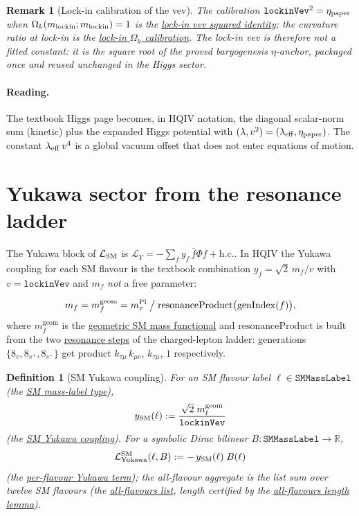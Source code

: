\documentclass[11pt]{amsart}
\newtheorem{definition}[theorem]{Definition}
\newtheorem{remark}[theorem]{Remark}
\begin{document}
\begin{remark}[Lock-in calibration of the vev]
\label{rem:lockin}
The calibration $\texttt{lockinVev}^2=\eta_{\rm paper}$ when
$\Omega_k(m_{\rm lockin};m_{\rm lockin})=1$ is the
\hyperref[lean:lockin-vev-sq]{lock-in vev squared identity}; the curvature
ratio at lock-in is the
\hyperref[lean:omega-k-lockin]{lock-in $\Omega_k$ calibration}. The lock-in
vev is therefore \emph{not} a fitted constant: it is the square root of the
proved baryogenesis $\eta$-anchor, packaged once and reused unchanged in the
Higgs sector.
\end{remark}

\paragraph{Reading.}
The textbook Higgs page becomes, in HQIV notation, the diagonal scalar-norm
sum (kinetic) plus the expanded Higgs potential with
$(\lambda,v^2)=(\lambda_{\rm eff},\eta_{\rm paper})$. The constant
$\lambda_{\rm eff}\,v^4$ is a global vacuum offset that does not enter
equations of motion.

\section{Yukawa sector from the resonance ladder}
\label{sec:yukawa}

The Yukawa block of $\mathcal{L}_{\rm SM}$ is
$\mathcal{L}_Y=-\sum_f y_f\,\bar f\Phi f + \text{h.c.}$. In HQIV the Yukawa
coupling for each SM flavour is the textbook combination $y_f=\sqrt{2}\,
m_f/v$ with $v=\texttt{lockinVev}$ and $m_f$ \emph{not} a free parameter:

\[
m_f = m_f^{\mathrm{geom}}
= m_\tau^{\rm Pl}\;\big/\;\mathrm{resonanceProduct}\bigl(\mathrm{genIndex}(f)\bigr) ,
\]
where $m_f^{\mathrm{geom}}$ is the
\hyperref[lean:sm-mass-label]{geometric SM mass functional} and
$\mathrm{resonanceProduct}$ is built from the two
\hyperref[lean:resonance-steps]{resonance steps} of the charged-lepton
ladder: generations $\{8_v, 8_{s^+}, 8_{s^-}\}$ get product
$k_{\tau\mu}\,k_{\mu e}$, $k_{\tau\mu}$, $1$ respectively.

\begin{definition}[SM Yukawa coupling]
\label{def:yukawa}
For an SM flavour label $\ell\in\texttt{SMMassLabel}$ (the
\hyperref[lean:sm-mass-label-type]{SM mass-label type}),
\[
y_{\rm SM}(\ell)
:= \frac{\sqrt{2}\;m_\ell^{\mathrm{geom}}}{\texttt{lockinVev}}
\]
(the \hyperref[lean:y-SM]{SM Yukawa coupling}). For a symbolic Dirac bilinear
$B:\texttt{SMMassLabel}\to\mathbb{R}$,
\[
\mathcal{L}^{\rm SM}_{\rm Yukawa}(\ell, B)
:= -\,y_{\rm SM}(\ell)\;B(\ell)
\]
(the \hyperref[lean:L-SM-Yukawa]{per-flavour Yukawa term}); the all-flavour
aggregate is the list sum over twelve SM flavours (the
\hyperref[lean:all-flavours]{all-flavours list}, length certified by the
\hyperref[lean:all-flavours-len]{all-flavours length lemma}).
\end{definition}
\end{document}
